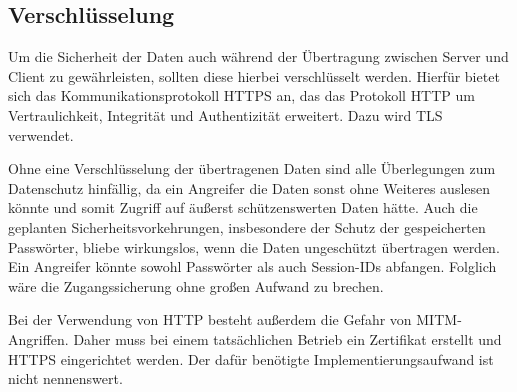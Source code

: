 \subsection{Verschlüsselung}

Um die Sicherheit der Daten auch während der Übertragung zwischen Server und Client zu gewährleisten, sollten diese hierbei verschlüsselt werden.
Hierfür bietet sich das Kommunikationsprotokoll \acs{HTTPS} an, das das Protokoll \acs{HTTP} um Vertraulichkeit, Integrität und Authentizität erweitert.
Dazu wird \ac{TLS} verwendet.

Ohne eine Verschlüsselung der übertragenen Daten sind alle Überlegungen zum Datenschutz hinfällig, da ein Angreifer die Daten sonst ohne Weiteres auslesen könnte und somit Zugriff auf äußerst schützenswerten Daten hätte.
Auch die geplanten Sicherheitsvorkehrungen, insbesondere der Schutz der gespeicherten Passwörter, bliebe wirkungslos, wenn die Daten ungeschützt übertragen werden.
Ein Angreifer könnte sowohl Passwörter als auch Session-IDs abfangen.
Folglich wäre die Zugangssicherung ohne großen Aufwand zu brechen.

Bei der Verwendung von \acs{HTTP} besteht außerdem die Gefahr von \ac*{MITM}-Angriffen.
Daher muss bei einem tatsächlichen Betrieb ein Zertifikat erstellt und \acs{HTTPS} eingerichtet werden.
Der dafür benötigte Implementierungsaufwand ist nicht nennenswert.
